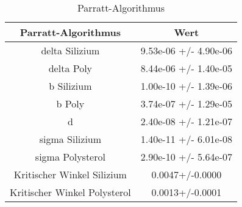 \begin{table}[h!]
    \centering
    \begin{tabular}{c c}
        \toprule
        \textbf{Parratt-Algorithmus} & \textbf{Wert} \\
        \midrule
        delta Silizium & 9.53e-06 +/- 4.90e-06 \\ 
        delta Poly & 8.44e-06 +/- 1.40e-05 \\ 
        b Silizium & 1.00e-10 +/- 1.39e-06 \\ 
        b Poly & 3.74e-07 +/- 1.29e-05 \\ 
        d & 2.40e-08 +/- 1.21e-07 \\ 
        sigma Silizium & 1.40e-11 +/- 6.01e-08 \\ 
        sigma Polysterol & 2.90e-10 +/- 5.64e-07 \\ 
        Kritischer Winkel Silizium & 0.0047+/-0.0000 \\ 
        Kritischer Winkel Polysterol & 0.0013+/-0.0001 \\ 
        \bottomrule
    \end{tabular}
    \caption{Parratt-Algorithmus}
    \label{tab:parratt}
\end{table}
